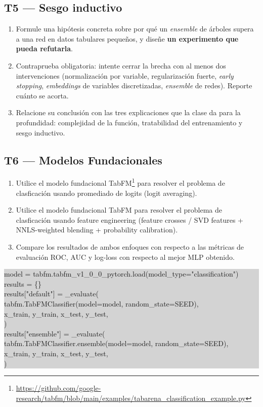 \documentclass[11pt, a4paper]{article}
\newcommand{\enlace}[1]{\par\vspace{2pt}{\footnotesize\color{StanfordGray}%
	$\hookrightarrow$\  #1}}
\begin{document}
\subsection*{T5 --- Sesgo inductivo}
\begin{enumerate}
	\item Formule una hip\'otesis concreta sobre por qu\'e un \emph{ensemble} de \'arboles supera a una red en datos tabulares peque\~nos, y dise\~ne \textbf{un experimento que pueda refutarla}.
	\item Contraprueba obligatoria: intente cerrar la brecha con al menos dos intervenciones (normalizaci\'on por variable, regularizaci\'on fuerte, \emph{early stopping}, \emph{embeddings} de variables discretizadas, \emph{ensemble} de redes). Reporte cu\'anto se acorta.
	\item Relacione su conclusi\'on con las tres explicaciones que la clase da para la profundidad: complejidad de la funci\'on, tratabilidad del entrenamiento y sesgo inductivo.
\end{enumerate}

\subsection*{T6 --- Modelos Fundacionales}
\begin{enumerate}
	\item Utilice el modelo fundacional TabFM\footnote{\url{https://github.com/google-research/tabfm/blob/main/examples/tabarena_classification_example.py}} para resolver el problema de clasficación usando promediado de logits (logit averaging).
	\item Utilice el modelo fundacional TabFM para resolver el problema de clasficación usando feature engineering (feature crosses / SVD features + NNLS-weighted blending + probability calibration).
	\item Compare los resultados de ambos enfoques con respecto a las m\'etricas de evaluaci\'on ROC, AUC y log-loss con respecto al mejor MLP obtenido.
\end{enumerate}

\vspace{0.3em}
\noindent\colorbox{LightGray}{\parbox{\dimexpr\textwidth-2\fboxsep}{\ttfamily\small
model = tabfm.tabfm\_v1\_0\_0\_pytorch.load(model\_type="classification")\\
results = \{\}\\
  results["default"] = \_evaluate(\\
      tabfm.TabFMClassifier(model=model, random\_state=SEED),\\
      x\_train, y\_train, x\_test, y\_test,\\
  )\\
  results["ensemble"] = \_evaluate(\\
      tabfm.TabFMClassifier.ensemble(model=model, random\_state=SEED),\\
      x\_train, y\_train, x\_test, y\_test,\\
  )\\
}}
\end{document}
